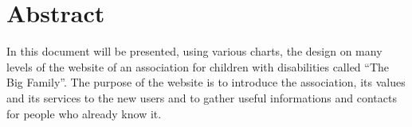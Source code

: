 %
%
%
\chapter{Abstract}
%
%
%
In this document will be presented, using various charts, the design on many levels of the website of an association for children with disabilities called ``The Big Family''. The purpose of the website is to introduce the association, its values and its services to the new users and to gather useful informations and contacts for people who already know it.
%
